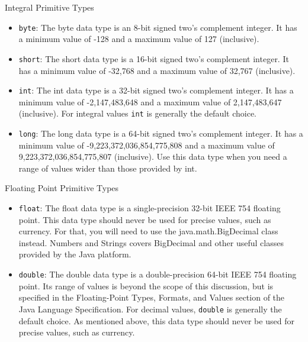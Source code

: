 \documentclass{beamer}
\begin{document}
\begin{frame}[fragile]{Integral Primitive Types}



\begin{itemize}
\item  {\tt byte}: The byte data type is an 8-bit signed two's complement integer. It has a minimum value of -128 and a maximum value of 127 (inclusive).

\item {\tt short}: The short data type is a 16-bit signed two's complement integer. It has a minimum value of -32,768 and a maximum value of 32,767 (inclusive).

\item {\tt int}: The int data type is a 32-bit signed two's complement integer. It has a minimum value of -2,147,483,648 and a maximum value of 2,147,483,647 (inclusive). For integral values {\tt int} is generally the default choice.

\item {\tt long}: The long data type is a 64-bit signed two's complement integer. It has a minimum value of -9,223,372,036,854,775,808 and a maximum value of 9,223,372,036,854,775,807 (inclusive). Use this data type when you need a range of values wider than those provided by int.
\end{itemize}

\end{frame}

\begin{frame}[fragile]{Floating Point Primitive Types}


\begin{itemize}
\item {\tt float}: The float data type is a single-precision 32-bit IEEE 754 floating point. This data type should never be used for precise values, such as currency. For that, you will need to use the java.math.BigDecimal class instead. Numbers and Strings covers BigDecimal and other useful classes provided by the Java platform.

\item {\tt double}: The double data type is a double-precision 64-bit IEEE 754 floating point. Its range of values is beyond the scope of this discussion, but is specified in the Floating-Point Types, Formats, and Values section of the Java Language Specification. For decimal values, {\tt double} is generally the default choice. As mentioned above, this data type should never be used for precise values, such as currency.
\end{itemize}

\end{frame}
\end{document}
